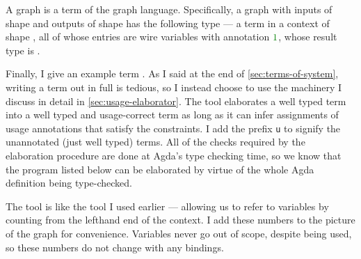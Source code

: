 
A graph is a term of the graph language.
Specifically, a graph with inputs of shape  and outputs of shape
 has the following type --- a term in a context of shape
, all of whose entries are wire variables with annotation $\gr1$,
whose result type is \AgdaSpace{}.


Finally, I give an example term .
As I said at the end of \cref{sec:terms-of-system}, writing a term out in full
is tedious, so I instead choose to use the machinery I discuss in detail in
\cref{sec:usage-elaborator}.
The  tool elaborates a well typed term into a well
typed and usage-correct term as long as it can infer assignments of usage
annotations that satisfy the constraints.
I add the prefix \texttt{u} to signify the unannotated (just well typed) terms.
All of the checks required by the elaboration procedure are done at Agda's type
checking time, so we know that the program listed below can be elaborated by
virtue of the whole Agda definition being type-checked.

The  tool is like the  tool I used
earlier --- allowing us to refer to variables by counting from the lefthand end
of the context.
I add these numbers to the picture of the graph for convenience.
Variables never go out of scope, despite being used, so these numbers do not
change with any bindings.

\noindent
\begin{minipage}[t]{0.33\textwidth}
\end{minipage}
\begin{minipage}[t]{0.67\textwidth}
  \AgdaNoSpaceAroundCode{}
  \AgdaSpaceAroundCode{}
\end{minipage}

